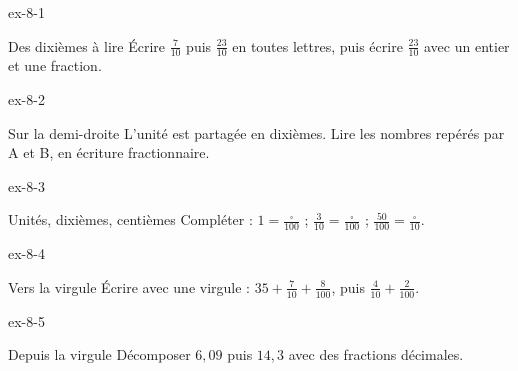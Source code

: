 \clearpage{}
\begin{blocLivre}{ex-8-1}\begin{exercice}[1]{Des dixièmes à lire}
Écrire $\frac7{10}$ puis $\frac{23}{10}$ en toutes lettres, puis écrire $\frac{23}{10}$ avec un entier et une fraction.
\end{exercice}\end{blocLivre}
\begin{blocLivre}{ex-8-2}\begin{exercice}[1]{Sur la demi-droite}
L’unité est partagée en dixièmes. Lire les nombres repérés par A et B, en écriture fractionnaire.
\label{fig-ex-8-2}
\end{exercice}\end{blocLivre}
\begin{blocLivre}{ex-8-3}\begin{exercice}[1]{Unités, dixièmes, centièmes}
Compléter : $1=\frac{\square}{100}$ ; $\frac3{10}=\frac{\square}{100}$ ; $\frac{50}{100}=\frac{\square}{10}$.
\end{exercice}\end{blocLivre}
\begin{blocLivre}{ex-8-4}\begin{exercice}[1]{Vers la virgule}
Écrire avec une virgule : $35+\frac7{10}+\frac8{100}$, puis $\frac4{10}+\frac2{100}$.
\end{exercice}\end{blocLivre}
\begin{blocLivre}{ex-8-5}\begin{exercice}[1]{Depuis la virgule}
Décomposer $6{,}09$ puis $14{,}3$ avec des fractions décimales.
\end{exercice}\end{blocLivre}

